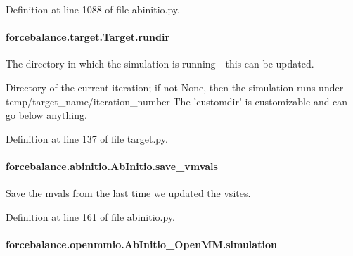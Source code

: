 Definition at line 1088 of file abinitio.\-py.

\hypertarget{classforcebalance_1_1target_1_1Target_a6872de5b2d4273b82336ea5b0da29c9e}{
\paragraph[{rundir}]{\setlength{\rightskip}{0pt plus 5cm}forcebalance.\-target.\-Target.\-rundir\hspace{0.3cm}{\ttfamily [inherited]}}}\label{classforcebalance_1_1target_1_1Target_a6872de5b2d4273b82336ea5b0da29c9e}


The directory in which the simulation is running -\/ this can be updated. 

Directory of the current iteration; if not None, then the simulation runs under temp/target\-\_\-name/iteration\-\_\-number The 'customdir' is customizable and can go below anything.

Definition at line 137 of file target.\-py.

\hypertarget{classforcebalance_1_1abinitio_1_1AbInitio_a22037bf43728fa45f387390005e0b131}{
\paragraph[{save\-\_\-vmvals}]{\setlength{\rightskip}{0pt plus 5cm}forcebalance.\-abinitio.\-Ab\-Initio.\-save\-\_\-vmvals\hspace{0.3cm}{\ttfamily [inherited]}}}\label{classforcebalance_1_1abinitio_1_1AbInitio_a22037bf43728fa45f387390005e0b131}


Save the mvals from the last time we updated the vsites. 



Definition at line 161 of file abinitio.\-py.

\hypertarget{classforcebalance_1_1openmmio_1_1AbInitio__OpenMM_ad999b78640bdd1bb9ea09f5ce82c95d7}{
\paragraph[{simulation}]{\setlength{\rightskip}{0pt plus 5cm}forcebalance.\-openmmio.\-Ab\-Initio\-\_\-\-Open\-M\-M.\-simulation}}\label{classforcebalance_1_1openmmio_1_1AbInitio__OpenMM_ad999b78640bdd1bb9ea09f5ce82c95d7}


